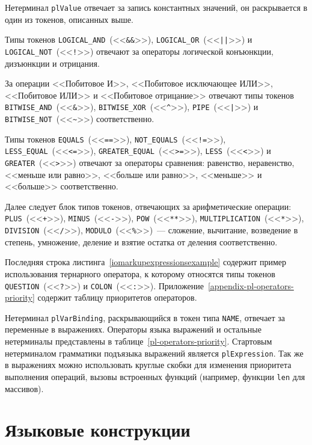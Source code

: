 \documentclass[times,specification,annotation]{style/itmo-student-thesis/itmo-student-thesis}
\begin{document}
Нетерминал \texttt{plValue} отвечает за запись константных значений, он раскрывается в один из токенов, описанных выше.

Типы токенов \texttt{LOGICAL\_AND}~(<<\texttt{\&\&}>>), \texttt{LOGICAL\_OR}~(<<\texttt{||}>>) и \texttt{LOGICAL\_NOT}~(<<\texttt{!}>>) отвечают за операторы логической конъюнкции, дизъюнкции и отрицания. 

За операции <<Побитовое И>>, <<Побитовое исключающее ИЛИ>>, <<Побитовое ИЛИ>> и <<Побитовое отрицание>> отвечают типы токенов \texttt{BITWISE\_AND}~(<<\texttt{\&}>>), \texttt{BITWISE\_XOR}~(<<\texttt{\textasciicircum}>>), \texttt{PIPE}~(<<\texttt{|}>>) и \texttt{BITWISE\_NOT}~(<<\texttt{\textasciitilde}>>) соответственно.

Типы токенов \texttt{EQUALS}~(<<\texttt{==}>>), \texttt{NOT\_EQUALS}~(<<\texttt{!=}>>), \texttt{LESS\_EQUAL}~(<<\texttt{<=}>>), \texttt{GREATER\_EQUAL}~(<<\texttt{>=}>>), \texttt{LESS}~(<<\texttt{<}>>) и \texttt{GREATER}~(<<\texttt{>}>>) отвечают за операторы сравнения: равенство, неравенство, <<меньше или равно>>, <<больше или равно>>, <<меньше>> и <<больше>> соответственно.

Далее следует блок типов токенов, отвечающих за арифметические операции: \texttt{PLUS}~(<<\texttt{+}>>), \texttt{MINUS}~(<<\texttt{-}>>), \texttt{POW}~(<<\texttt{**}>>), \texttt{MULTIPLICATION}~(<<\texttt{*}>>), \texttt{DIVISION}~(<<\texttt{/}>>), \texttt{MODULO}~(<<\texttt{\%}>>)~--- сложение, вычитание, возведение в степень, умножение, деление и взятие остатка от деления соответственно. 

Последняя строка листинга~\ref{iomarkupexpressionsexample} содержит пример использования тернарного оператора, к которому относятся типы токенов \texttt{QUESTION}~(<<\texttt{?}>>) и \texttt{COLON}~(<<\texttt{:}>>). Приложение~\ref{appendix-pl-operators-priority} содержит таблицу приоритетов операторов.

Нетерминал \texttt{plVarBinding}, раскрывающийся в токен типа \texttt{NAME}, отвечает за переменные в выражениях. Операторы языка выражений и остальные нетерминалы представлены в таблице~\ref{pl-operators-priority}. Стартовым нетерминалом грамматики подъязыка выражений является \texttt{plExpression}. Так же в выражениях можно использовать круглые скобки для изменения приоритета выполнения операций, вызовы встроенных функций (например, функции \texttt{len} для массивов).

\section{Языковые конструкции}
\end{document}
